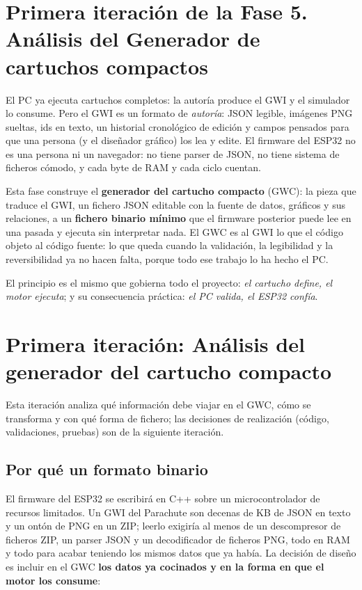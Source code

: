 \section{Primera iteración de la Fase 5. Análisis del Generador de cartuchos compactos}
\label{sec:F5Intro}

El PC ya ejecuta cartuchos completos: la autoría produce el GWI y el
simulador lo consume. Pero el GWI es un formato de \emph{autoría}:
JSON legible, imágenes PNG sueltas, ids en texto, un historial
cronológico de edición y campos pensados para que una persona (y el
diseñador gráfico) los lea y edite. El firmware del ESP32 no es una
persona ni un navegador: no tiene parser de JSON, no tiene sistema de
ficheros cómodo, y cada byte de RAM y cada ciclo cuentan.

Esta fase construye el \textbf{generador del cartucho compacto} (GWC):
la pieza que traduce el GWI, un fichero JSON editable con la fuente de datos, gráficos y sus relaciones, a un \textbf{fichero binario mínimo} que el firmware posterior puede lee en
una pasada y ejecuta sin interpretar nada. El GWC es al GWI lo que el
código objeto al código fuente: lo que queda cuando la validación, la
legibilidad y la reversibilidad ya no hacen falta, porque todo ese
trabajo lo ha hecho el PC.

El principio es el mismo que gobierna todo el proyecto: \emph{el cartucho define,
el motor ejecuta}; y su consecuencia práctica: \emph{el PC valida, el ESP32 confía}.

\section{Primera iteración: Análisis del generador del cartucho compacto}
\label{sec:F5I1}

Esta iteración analiza qué información debe viajar en el GWC, cómo se
transforma y con qué forma de fichero; las decisiones de realización
(código, validaciones, pruebas) son de la siguiente iteración.

\subsection{Por qué un formato binario}
\label{sec:F5Porque}

El firmware del ESP32 se escribirá en C++ sobre un microcontrolador
de recursos limitados. Un GWI del Parachute son decenas de KB de JSON
en texto y un ontón de PNG en un ZIP; leerlo exigiría al menos de un descompresor de ficheros ZIP, un parser JSON y un decodificador de ficheros PNG, todo en RAM y todo para acabar
teniendo los mismos datos que ya había. La decisión de diseño es
incluir en el GWC \textbf{los datos ya cocinados y en la forma en que el motor los consume}:

